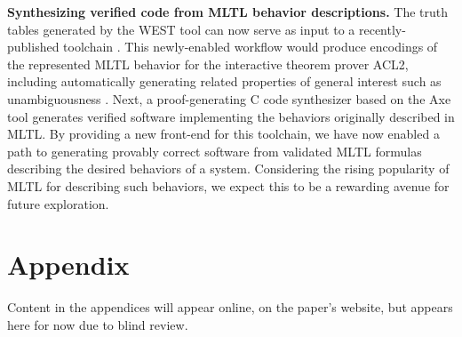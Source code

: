 \documentclass[runningheads]{llncs}
\begin{document}
\noindent \textbf{Synthesizing verified code from MLTL behavior descriptions.} The truth tables generated by the WEST tool can now serve as input to a recently-published toolchain \cite{dasc-2022}. This newly-enabled workflow would produce encodings of the represented MLTL behavior for the interactive theorem prover ACL2, including automatically generating related properties of general interest such as unambiguousness \cite{DBLP:journals/corr/abs-2205-11707,ACL2-Site,ACL2-Doc}. Next, a proof-generating C code synthesizer \cite{DBLP:journals/corr/abs-2205-11708} based on the Axe tool \cite{DBLP:phd/us/Smith11} generates verified software implementing the behaviors originally described in MLTL. By providing a new front-end for this toolchain, we have now enabled a path to generating provably correct software from validated MLTL formulas describing the desired behaviors of a system. Considering the rising popularity of MLTL for describing such behaviors, we expect this to be a rewarding avenue for future exploration. 

%
%
%
\newpage


\newpage
\appendix
\section*{Appendix} \label{Appendix}
\renewcommand{\thesection}{\Roman{section}}
Content in the appendices will appear online, on the paper's website, but appears here for now due to blind review.
\end{document}
